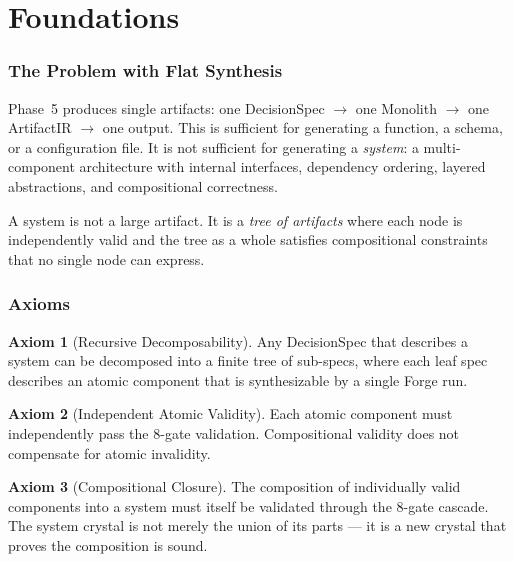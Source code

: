 \documentclass[11pt,a4paper,twoside]{article}
\theoremstyle{definition}
\newtheorem{axiom}{Axiom}[section]
\theoremstyle{plain}
\theoremstyle{remark}
\begin{document}
\tableofcontents
\newpage


\part{Foundations}\label{part:foundations}

\section{The Problem with Flat Synthesis}\label{sec:problem}

Phase~5 produces single artifacts: one DecisionSpec $\to$ one Monolith
$\to$ one ArtifactIR $\to$ one output. This is sufficient for
generating a function, a schema, or a configuration file. It is not
sufficient for generating a \emph{system}: a multi-component
architecture with internal interfaces, dependency ordering, layered
abstractions, and compositional correctness.

A system is not a large artifact. It is a \emph{tree of artifacts}
where each node is independently valid and the tree as a whole
satisfies compositional constraints that no single node can express.

\section{Axioms}\label{sec:axioms}

\begin{axiom}[Recursive Decomposability]\label{ax:decomp}
Any DecisionSpec that describes a system can be decomposed into a
finite tree of sub-specs, where each leaf spec describes an atomic
component that is synthesizable by a single Forge run.
\end{axiom}

\begin{axiom}[Independent Atomic Validity]\label{ax:atomvalid}
Each atomic component must independently pass the 8-gate validation.
Compositional validity does not compensate for atomic invalidity.
\end{axiom}

\begin{axiom}[Compositional Closure]\label{ax:compclosure}
The composition of individually valid components into a system must
itself be validated through the 8-gate cascade. The system crystal is
not merely the union of its parts --- it is a new crystal that proves
the composition is sound.
\end{axiom}
\end{document}
